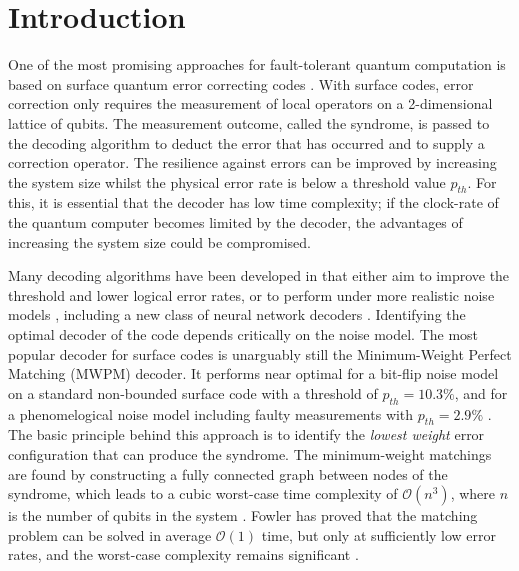 \section{Introduction}\label{sec:introduction}
One of the most promising approaches for fault-tolerant quantum computation is based on surface quantum error correcting codes \cite{dennis2002topological, kitaev2003fault}. With surface codes, error correction only requires the measurement of local operators on a 2-dimensional lattice of qubits. The measurement outcome, called the syndrome, is passed to the decoding algorithm to deduct the error that has occurred and to supply a correction operator. The resilience against errors can be improved by increasing the system size whilst the physical error rate is below a threshold value $p_{th}$. For this, it is essential that the decoder has low time complexity; if the clock-rate of the quantum computer becomes limited by the decoder, the advantages of increasing the system size could be compromised.

Many decoding algorithms have been developed in that either aim to improve the threshold and lower logical error rates, or to perform under more realistic noise models \cites{wang2003confinement, raussendorf2007faulttolerant, fowler2013minimum, tuckett2020fault, bravyi2014efficient, heim2016optimal, anwar2014fast, bombin2012universal, bravyi2013quantum, darmawan2018linear, duclos2010fast, duclos2013fault, herold2015cellular, horsman2012surface, hutter2015improved, kubica2019cellular, nickerson2019analysing, watson2015fast, wootton2012high, huang2020fault}, including a new class of neural network decoders \cites{baireuther2019neural, chamberland2018deep, liu2019neural, nautrup2019optimizing, torlai2017neural, varsamopoulos2017decoding, varsamopoulos2020decoding}. Identifying the optimal decoder of the code depends critically on the noise model. The most popular decoder for surface codes is unarguably still the Minimum-Weight Perfect Matching (MWPM) decoder. It performs near optimal for a bit-flip noise model \cite{dennis2002topological} on a standard non-bounded surface code with a threshold of $p_{th} = 10.3\%$, and for a phenomelogical noise model including faulty measurements \cite{wang2003confinement} with $p_{th} = 2.9\%$ . The basic principle behind this approach is to identify the \emph{lowest weight} error configuration that can produce the syndrome. The minimum-weight matchings are found by constructing a fully connected graph between nodes of the syndrome, which leads to a cubic worst-case time complexity of $\mathcal{O}(n^3)$, where $n$ is the number of qubits in the system \cite{kolmogorov2009blossom}. Fowler has proved that the matching problem can be solved in average $\mathcal{O}(1)$ time, but only at sufficiently low error rates, and the worst-case complexity remains significant \cite{fowler2013minimum}. 


